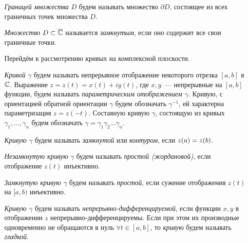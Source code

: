 \begin{definition}
\textit{Границей множества \(D\)} будем называть множество \(\partial D\), состоящее из всех
граничных точек множества \(D\).
\end{definition}

\begin{definition}
\textit{Множество \(D \subset \overline{\mathbb{C}}\)} называется \textit{замкнутым}, если оно содержит все свои
граничные точки.
\end{definition}

Перейдём к рассмотрению кривых на комплексной плоскости.

\begin{definition}
\textit{Кривой \(\gamma\)} будем называть непрерывное отображение некоторого отрезка \([a, b]\) в
\(\mathbb{C}\). Выражение \(z = z(t) = x(t) + iy(t)\), где \(x, y\)~--- непрерывные на \([a,b]\) функции,
будем называть \textit{параметрическим отображением \(\gamma\)}. Кривую, с ориентацией обратной
ориентации \(\gamma\) будем обозначать \(\gamma^{-1}\), ей характерна параметризация \(z = z(-t)\).
Составную кривую \(\gamma\), состоящую из кривых \(\gamma_1, \dots, \gamma_n\) будем обозначать
\(\gamma = \gamma_1 \gamma_2 \dots \gamma_n\).
\end{definition}

\begin{definition}
\textit{Кривую \(\gamma\)} будем называть \textit{замкнутой} или \textit{контуром}, если \(z(a) \hm=
z(b)\).
\end{definition}

\begin{definition}
\textit{Незамкнутую кривую \(\gamma\)} будем называть \textit{простой (жордановой)}, если отображение
\(z(t)\) инъективно.
\end{definition}

\begin{definition}
\textit{Замкнутую кривую \(\gamma\)} будем называть \textit{простой}, если сужение отображения
\(z(t)\) на \([a, b)\) инъективно.
\end{definition}

\begin{definition}
\textit{Кривую \(\gamma\)} будем называть \textit{непрерывно-дифференцируемой}, если функции \(x, y\)
в отображении \(z\) непрерывно-дифференцируемы. Если при этом их производные одновременно не
обращаются в нуль \(\forall t \in [a,b]\), то \textit{кривую} будем называть \textit{гладкой}.
\end{definition}

